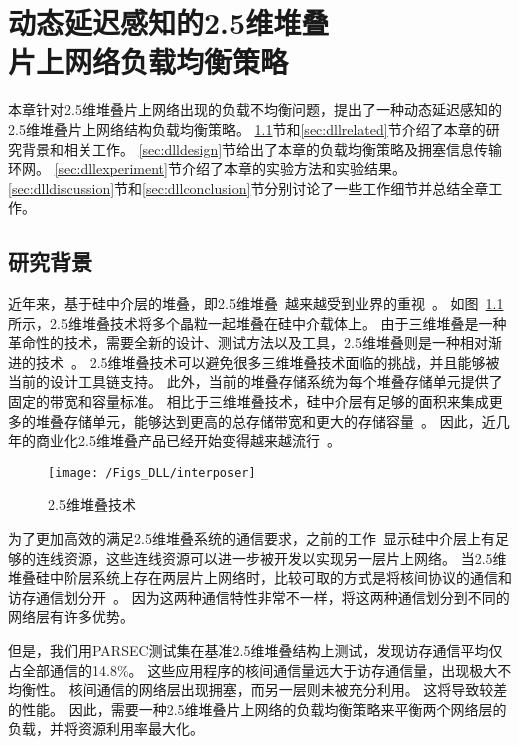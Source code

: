 \chapter{动态延迟感知的2.5维堆叠\\片上网络负载均衡策略}
\label{chap:DLL}
本章针对2.5维堆叠片上网络出现的负载不均衡问题，提出了一种动态延迟感知的2.5维堆叠片上网络结构负载均衡策略。
\ref{sec:dllbackground}节和\ref{sec:dllrelated}节介绍了本章的研究背景和相关工作。
\ref{sec:dlldesign}节给出了本章的负载均衡策略及拥塞信息传输环网。
\ref{sec:dllexperiment}节介绍了本章的实验方法和实验结果。
\ref{sec:dlldiscussion}节和\ref{sec:dllconclusion}节分别讨论了一些工作细节并总结全章工作。

\section{研究背景}
\label{sec:dllbackground}

近年来，基于硅中介层的堆叠，即2.5维堆叠~越来越受到业界的重视~。
如图~\ref{fig:interposer}所示，2.5维堆叠技术将多个晶粒一起堆叠在硅中介载体上。
由于三维堆叠是一种革命性的技术，需要全新的设计、测试方法以及工具，2.5维堆叠则是一种相对渐进的技术~。
2.5维堆叠技术可以避免很多三维堆叠技术面临的挑战，并且能够被当前的设计工具链支持。
此外，当前的堆叠存储系统为每个堆叠存储单元提供了固定的带宽和容量标准。
相比于三维堆叠技术，硅中介层有足够的面积来集成更多的堆叠存储单元，能够达到更高的总存储带宽和更大的存储容量~。
因此，近几年的商业化2.5维堆叠产品已经开始变得越来越流行~。

\begin{figure}[htbp] %
  \centering
  \texttt{[image: /Figs\_DLL/interposer]}
  \caption{2.5维堆叠技术}
  \label{fig:interposer}
\end{figure}

为了更加高效的满足2.5维堆叠系统的通信要求，之前的工作~显示硅中介层上有足够的连线资源，这些连线资源可以进一步被开发以实现另一层片上网络。
当2.5维堆叠硅中阶层系统上存在两层片上网络时，比较可取的方式是将核间协议的通信和访存通信划分开~。
因为这两种通信特性非常不一样，将这两种通信划分到不同的网络层有许多优势。

但是，我们用PARSEC测试集在基准2.5维堆叠结构上测试，发现访存通信平均仅占全部通信的14.8\%。
这些应用程序的核间通信量远大于访存通信量，出现极大不均衡性。
核间通信的网络层出现拥塞，而另一层则未被充分利用。
这将导致较差的性能。
因此，需要一种2.5维堆叠片上网络的负载均衡策略来平衡两个网络层的负载，并将资源利用率最大化。

